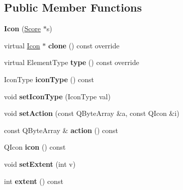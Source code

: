\subsection*{Public Member Functions}
\begin{DoxyCompactItemize}
\item 
\mbox{\label{class_ms_1_1_icon_a09e70ea0f917774f9737213c608e742d}} 
{\bfseries Icon} (\hyperlink{class_ms_1_1_score}{Score} $\ast$s)
\item 
\mbox{\label{class_ms_1_1_icon_a937e4e3e226a2cd48d1de2ec83392a26}} 
virtual \hyperlink{class_ms_1_1_icon}{Icon} $\ast$ {\bfseries clone} () const override
\item 
\mbox{\label{class_ms_1_1_icon_ab68d971e0e7f2db0cfdab43427bf3e1f}} 
virtual Element\+Type {\bfseries type} () const override
\item 
\mbox{\label{class_ms_1_1_icon_a0f37defec7d40ee1b2f3c050e034b817}} 
Icon\+Type {\bfseries icon\+Type} () const
\item 
\mbox{\label{class_ms_1_1_icon_ae22bdf5c94da8709fb0d52fa1c37cc84}} 
void {\bfseries set\+Icon\+Type} (Icon\+Type val)
\item 
\mbox{\label{class_ms_1_1_icon_aba88f68a0cddb9f969ea8aa847ca68ab}} 
void {\bfseries set\+Action} (const Q\+Byte\+Array \&a, const Q\+Icon \&i)
\item 
\mbox{\label{class_ms_1_1_icon_a720c1a85676a338b67119922f690cb40}} 
const Q\+Byte\+Array \& {\bfseries action} () const
\item 
\mbox{\label{class_ms_1_1_icon_adf39ee51d0bfdf53c264681ad076391c}} 
Q\+Icon {\bfseries icon} () const
\item 
\mbox{\label{class_ms_1_1_icon_a05e97d05e365813e926129523bd5fab7}} 
void {\bfseries set\+Extent} (int v)
\item 
\mbox{\label{class_ms_1_1_icon_accd8dafc8515c2749891704c0efdb362}} 
int {\bfseries extent} () const
\item 

\end{DoxyCompactItemize}
